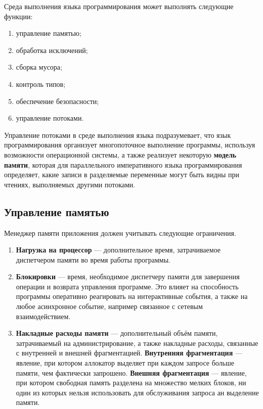 Среда выполнения языка программирования может выполнять следующие функции: \cite{dotnet_clr}

\begin{enumerate}[label*=\arabic*)]
	\item управление памятью;
	\item обработка исключений; 
	\item сборка мусора; 
	\item контроль типов;
	\item обеспечение безопасности; 
	\item управление потоками. 
\end{enumerate}

Управление потоками в среде выполнения языка подразумевает, что язык программирования организует многопоточное выполнение программы, используя возможности операционной системы, а также реализует некоторую \textbf{модель памяти}, которая для параллельного императивного языка программирования определяет, какие записи в разделяемые переменные могут быть видны при чтениях, выполняемых другими потоками. \cite{memory_model}

\subsection{Управление памятью}

Менеджер памяти приложения должен учитывать следующие ограничения. \cite{mm_overview}

\begin{enumerate}[label*=\arabic*.]
	\item \textbf{Нагрузка на процессор} --- дополнительное время, затрачиваемое диспетчером памяти во время работы программы.
	\item \textbf{Блокировки} --- время, необходимое диспетчеру памяти для завершения операции и возврата управления программе. Это влияет на способность программы оперативно реагировать на интерактивные события, а также на любое асинхронное событие, например связанное с сетевым взаимодействием.
	\item \textbf{Накладные расходы памяти} --- дополнительный объём памяти, затрачиваемый на администрирование, а также накладные расходы, связанные с внутренней и внешней фрагментацией. \textbf{Внутренняя фрагментация} \cite{glossary} --- явление, при котором аллокатор выделяет при каждом запросе больше памяти, чем фактически запрошено. \textbf{Внешняя фрагментация} \cite{glossary} --- явление, при котором свободная память разделена на множество мелких блоков, ни один из которых нельзя использовать для обслуживания запроса ан выделение памяти.
\end{enumerate}

